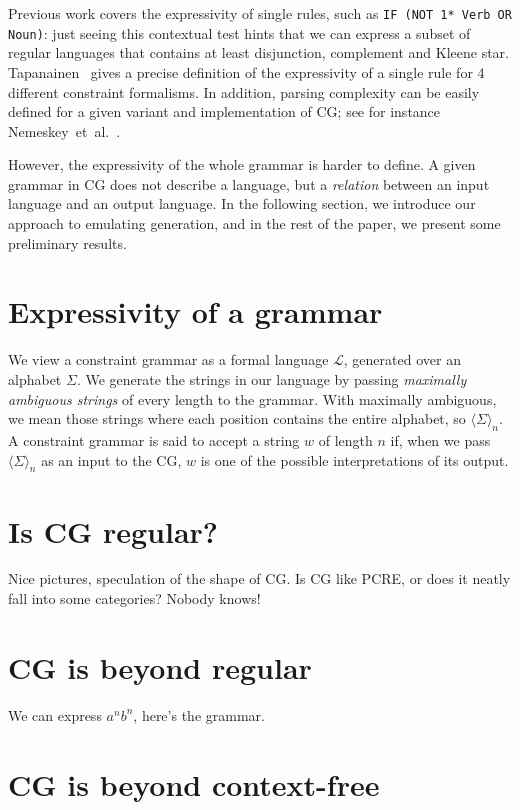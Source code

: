 \documentclass[11pt]{article}
\begin{document}
Previous work covers the expressivity of single rules, such as \texttt{IF (NOT 1* Verb OR Noun)}: just seeing this contextual test hints that we can express a subset of regular languages that contains at least disjunction, complement and Kleene star. 
Tapanainen~ gives a precise definition of the expressivity of a single rule for 4 different constraint formalisms. In addition, parsing complexity can be easily defined for a given variant and implementation of CG; see for instance Nemeskey~et~al.~.

However, the expressivity of the whole grammar is harder to define. 
A given grammar in CG does not describe a language, but a \emph{relation} between an input language and an output language. In the following section, we introduce our approach to emulating generation, and in the rest of the paper, we present some preliminary results.

\section{Expressivity of a grammar}

We view a constraint grammar as a formal language $\mathcal{L}$, generated over an 
alphabet $\Sigma$. We generate the strings in our language by passing 
\emph{maximally ambiguous strings} of every length to the grammar. 
With maximally ambiguous, we mean  those strings where each position contains the 
entire alphabet, so $\langle \Sigma \rangle_n$. 
A constraint grammar is said to accept a string $w$ of length $n$ if, 
when we pass $\langle \Sigma \rangle_n$ as an input to the CG,
$w$ is one of the possible interpretations of its output.

\section{Is CG regular?}

Nice pictures, speculation of the shape of CG. Is CG like PCRE, or does it neatly fall into some categories? Nobody knows!

\section{CG is beyond regular}

We can express $a^nb^n$, here's the grammar.

\section{CG is beyond context-free}
\end{document}
